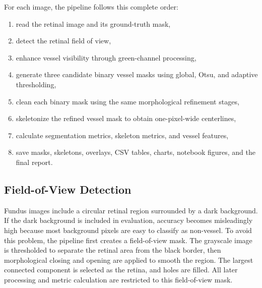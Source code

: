 \documentclass[12pt,a4paper]{article}
\begin{document}
For each image, the pipeline follows this complete order:
\begin{enumerate}
    \item read the retinal image and its ground-truth mask,
    \item detect the retinal field of view,
    \item enhance vessel visibility through green-channel processing,
    \item generate three candidate binary vessel masks using global, Otsu, and adaptive thresholding,
    \item clean each binary mask using the same morphological refinement stages,
    \item skeletonize the refined vessel mask to obtain one-pixel-wide centerlines,
    \item calculate segmentation metrics, skeleton metrics, and vessel features,
    \item save masks, skeletons, overlays, CSV tables, charts, notebook figures, and the final report.
\end{enumerate}

\subsection{Field-of-View Detection}
Fundus images include a circular retinal region surrounded by a dark background. If the dark background is included in evaluation, accuracy becomes misleadingly high because most background pixels are easy to classify as non-vessel. To avoid this problem, the pipeline first creates a field-of-view mask. The grayscale image is thresholded to separate the retinal area from the black border, then morphological closing and opening are applied to smooth the region. The largest connected component is selected as the retina, and holes are filled. All later processing and metric calculation are restricted to this field-of-view mask.
\end{document}
